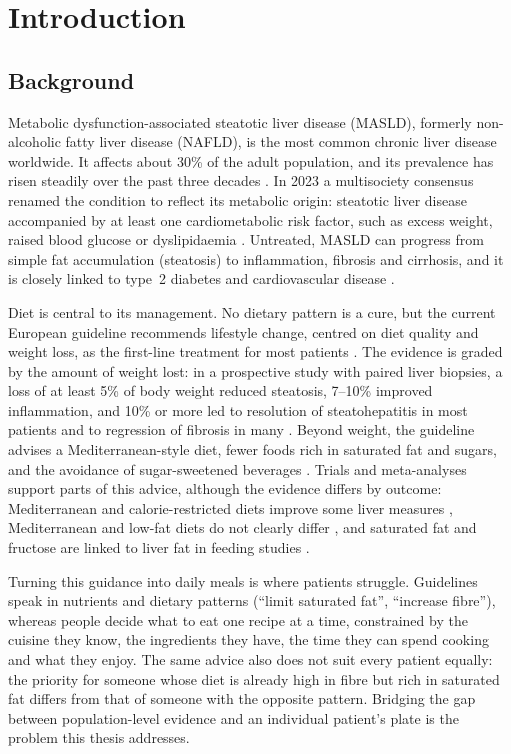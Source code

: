 \chapter{Introduction}
\label{chap:introduction}
\section{Background}
\label{sec:background}
Metabolic dysfunction-associated steatotic liver disease (MASLD), formerly
non-alcoholic fatty liver disease (NAFLD), is the most common chronic liver
disease worldwide. It affects about 30\% of the adult population, and its
prevalence has risen steadily over the past three decades
\cite{younossi2023global,riazi2022prevalence}. In 2023 a multisociety consensus
renamed the condition to reflect its metabolic origin: steatotic liver disease
accompanied by at least one cardiometabolic risk factor, such as excess
weight, raised blood glucose or dyslipidaemia \cite{rinella2023nomenclature}.
Untreated, MASLD can progress from simple fat accumulation (steatosis) to
inflammation, fibrosis and cirrhosis, and it is closely linked to type~2
diabetes and cardiovascular disease \cite{easl2024masld}.

Diet is central to its management. No dietary pattern is a cure, but the
current European guideline recommends lifestyle change, centred on diet
quality and weight loss, as the first-line treatment for most patients
\cite{easl2024masld}. The evidence is graded by the amount of weight lost: in
a prospective study with paired liver biopsies, a loss of at least 5\% of body
weight reduced steatosis, 7--10\% improved inflammation, and 10\% or more led
to resolution of steatohepatitis in most patients and to regression of
fibrosis in many \cite{vilargomez2015weight}. Beyond weight, the guideline
advises a Mediterranean-style diet, fewer foods rich in saturated fat and
sugars, and the avoidance of sugar-sweetened beverages \cite{easl2024masld}.
Trials and meta-analyses support parts of this advice, although the evidence
differs by outcome: Mediterranean and calorie-restricted diets improve some
liver measures \cite{sangouni2022mediterranean,haigh2022mediterranean},
Mediterranean and low-fat diets do not clearly differ
\cite{xiong2024mediterranean}, and saturated fat and fructose are linked
to liver fat in feeding studies \cite{luukkonen2018saturated,chiu2014fructose}.

Turning this guidance into daily meals is where patients struggle. Guidelines
speak in nutrients and dietary patterns (``limit saturated fat'', ``increase
fibre''), whereas people decide what to eat one recipe at a time, constrained
by the cuisine they know, the ingredients they have, the time they can spend
cooking and what they enjoy. The same advice also does not suit every
patient equally: the priority for someone whose diet is already high in fibre
but rich in saturated fat differs from that of someone with the opposite
pattern. Bridging the gap between population-level evidence and an individual
patient's plate is the problem this thesis addresses.

